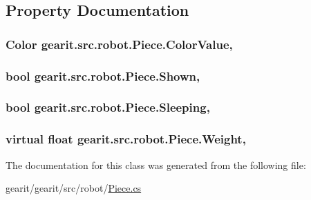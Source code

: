 \subsection{Property Documentation}
\hypertarget{classgearit_1_1src_1_1robot_1_1_piece_a4600408118052b88110902c3386d4255}{
\subsubsection[{Color\+Value}]{\setlength{\rightskip}{0pt plus 5cm}Color gearit.\+src.\+robot.\+Piece.\+Color\+Value\hspace{0.3cm}{\ttfamily [get]}, {\ttfamily [set]}}}\label{classgearit_1_1src_1_1robot_1_1_piece_a4600408118052b88110902c3386d4255}
\hypertarget{classgearit_1_1src_1_1robot_1_1_piece_a7f04d7c15839af2c999187e7b7fdd278}{
\subsubsection[{Shown}]{\setlength{\rightskip}{0pt plus 5cm}bool gearit.\+src.\+robot.\+Piece.\+Shown\hspace{0.3cm}{\ttfamily [get]}, {\ttfamily [set]}}}\label{classgearit_1_1src_1_1robot_1_1_piece_a7f04d7c15839af2c999187e7b7fdd278}
\hypertarget{classgearit_1_1src_1_1robot_1_1_piece_a22837d8d8ce49065a18a64df4397641d}{
\subsubsection[{Sleeping}]{\setlength{\rightskip}{0pt plus 5cm}bool gearit.\+src.\+robot.\+Piece.\+Sleeping\hspace{0.3cm}{\ttfamily [get]}, {\ttfamily [set]}}}\label{classgearit_1_1src_1_1robot_1_1_piece_a22837d8d8ce49065a18a64df4397641d}
\hypertarget{classgearit_1_1src_1_1robot_1_1_piece_a296326e78b47f09749230b97d8a00b6c}{
\subsubsection[{Weight}]{\setlength{\rightskip}{0pt plus 5cm}virtual float gearit.\+src.\+robot.\+Piece.\+Weight\hspace{0.3cm}{\ttfamily [get]}, {\ttfamily [set]}}}\label{classgearit_1_1src_1_1robot_1_1_piece_a296326e78b47f09749230b97d8a00b6c}


The documentation for this class was generated from the following file\+:\begin{DoxyCompactItemize}
\item 
gearit/gearit/src/robot/\hyperlink{_piece_8cs}{Piece.\+cs}\end{DoxyCompactItemize}
